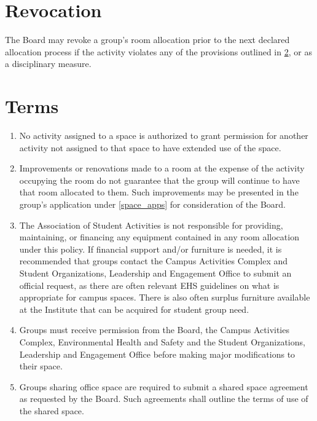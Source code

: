 \documentclass[12pt]{constitution}
\begin{document}
\section{Revocation}
The Board may revoke a group's room allocation prior to the next declared allocation process if the
    activity violates any of the provisions outlined in \ref{space_app_terms}, or as a disciplinary measure.

\section{Terms}
\label{space_app_terms}
\begin{enumerate}
    \item No activity assigned to a space is authorized to grant permission for another activity
        not assigned to that space to have extended use of the space.
    
    \item Improvements or renovations made to a room at the expense of the activity occupying the
        room do not guarantee that the group will continue to have that room allocated to them.
    Such improvements may be presented in the group's application under \ref{space_apps} for
        consideration of the Board.
    
    \item The Association of Student Activities is not responsible for providing, maintaining, or
        financing any equipment contained in any room allocation under this policy.
    If financial support and/or furniture is needed, it is recommended that groups contact the
        Campus Activities Complex and Student Organizations, Leadership and Engagement Office to submit
        an official request, as there are often relevant EHS guidelines on what is appropriate for
        campus spaces.
    There is also often surplus furniture available at the Institute that can be acquired for student group need.

    \item Groups must receive permission from the Board, the Campus Activities Complex,
        Environmental Health and Safety and the Student Organizations, Leadership and Engagement Office
        before making major modifications to their space.
    
    \item Groups sharing office space are required to submit a shared space agreement as
        requested by the Board. Such agreements shall outline the terms of use of the shared space.


\end{enumerate}
\end{document}
